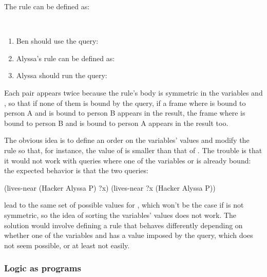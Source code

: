 \begin{exe}[4.58]
    The rule can be defined as:
\end{exe}

\begin{exe}[4.59]
    \ \vspace{-20pt}
    \begin{enumerate}
        \item Ben should use the query:
        \item Alyssa’s rule can be defined as:
        \item Alyssa should run the query:
    \end{enumerate}
\end{exe}

\begin{exe}[4.60]
    Each pair appears twice because the rule’s body is symmetric in the 
    variables  and , so that if none of them is 
    bound by the query, if a frame where  is bound to person 
    A and  is bound to person B appears in the result, the frame 
    where  is bound to person B and  is bound to 
    person A appears in the result too.

    The obvious idea is to define an order on the variables’ values and modify 
    the rule so that, for instance, the value of  is smaller 
    than that of . The trouble is that it would not work with 
    queries where one of the variables  or  is 
    already bound: the expected behavior is that the two queries:
    \begin{cscm}
        (lives-near (Hacker Alyssa P) ?x)
        (lives-near ?x (Hacker Alyssa P))
    \end{cscm}
    lead to the same set of possible values for , which won’t be the 
    case if  is not symmetric, so the idea of sorting the 
    variables’ values does not work. The solution would involve defining a rule 
    that behaves differently depending on whether one of the variables 
     and  has a value imposed by the query, 
    which does not seem possible, or at least not easily.
\end{exe}

\subsubsection{Logic as programs}

